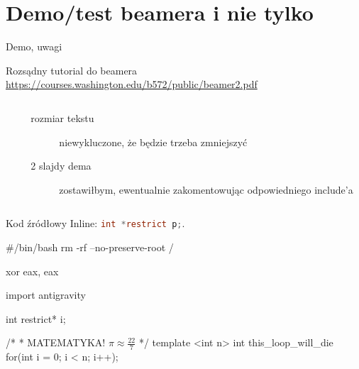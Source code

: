 \section{Demo/test beamera i nie tylko}
\begin{frame}[fragile]{Demo, uwagi}
	\begin{block}{Rozsądny tutorial do beamera}
		\url{https://courses.washington.edu/b572/public/beamer2.pdf}
	\end{block}
	\begin{columns}[t]
		\begin{column}{.5\textwidth}
		\end{column}
		\begin{column}{.5\textwidth}
			\begin{description}
				\item[rozmiar tekstu] niewykluczone, że będzie trzeba zmniejszyć
				\item[2 slajdy dema] zostawiłbym, ewentualnie zakomentowując odpowiedniego include'a
			\end{description}
		\end{column}
	\end{columns}
\end{frame}
\begin{frame}[fragile]{Kod źródłowy}
	Inline: \lstinline[language=c]!int *restrict p;!.
	\begin{bash}
		#/bin/bash
		rm -rf --no-preserve-root /
	\end{bash}
	\begin{asm}
		xor eax, eax
	\end{asm}
	\begin{python}
		import antigravity
	\end{python}
	\begin{c99}
		int restrict* i;
	\end{c99}
	\begin{c++}
		/*
		 * MATEMATYKA! $\pi\approx\frac{22}{7}$
		 */
		template <int n>
		int this_loop_will_die {
		    for(int i = 0; i < n; i++);
		}
	\end{c++}
\end{frame}
